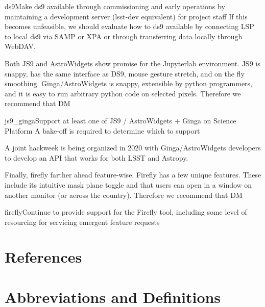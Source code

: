 \documentclass[DM,authoryear,toc]{lsstdoc}
\begin{document}
\begin{recommendation}{ds9}{Make ds9 available through commissioning and early operations by maintaining a development server (lsst-dev equivalent) for project staff}
{If this becomes unfeasible, we should evaluate how to ds9 available by connecting LSP to local ds9 via SAMP or XPA or through transferring data locally through WebDAV.}
\end{recommendation}

Both JS9 and AstroWidgets show promise for the Jupyterlab environment.
JS9 is snappy, has the same interface as DS9, mouse gesture stretch, and on the fly smoothing.
Ginga/AstroWidgets is snappy, extensible by python programmers, and it is easy to run arbitrary python code on selected pixels.
Therefore we recommend that DM
\begin{recommendation}{js9_ginga}{Support at least one of JS9 / AstroWidgets + Ginga on Science Platform}
A bake-off is required to determine which to support
\end{recommendation}

A joint hackweek is being organized in 2020 with Ginga/AstroWidgets developers to develop an API that works for both LSST and Astropy.

Finally, firefly farther ahead feature-wise.
Firefly has a few unique features.
These include its intuitive mask plane toggle and that users can open in a window on another monitor (or across the country).
Therefore we recommend that DM
\begin{recommendation}{firefly}{Continue to provide support for the Firefly tool, including some level of resourcing for servicing emergent feature requests}
\end{recommendation}


\appendix

\section{References}
\label{sec:bib}


\section{Abbreviations and Definitions}
\label{sec:acronyms}

\end{document}
